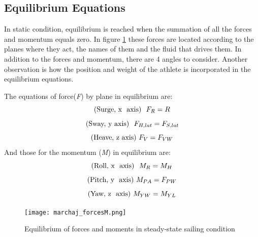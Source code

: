 \subsection {Equilibrium Equations} \label{sec:equil_equat}
In static condition, equilibrium is reached when the summation of all the forces and momentum equals zero. In figure \ref{forces_m} these forces are located according to the planes where they act, the names of them and the fluid that drives them. In addition to the forces and momentum, there are 4 angles to consider. Another observation is how the position and weight of the athlete is incorporated in the equilibrium equations. \par 

The equations of force(\textit{F}) by plane in equilibrium are:
\begin{equation}\label{eq:force_x}
    \text{(Surge, x  \space axis)  \space} F_{R}=R \\
\end{equation}
\begin{equation}\label{eq:force_y}
    \text{(Sway, y\space axis) \space } \space F_{H,lat}=F_{S,lat}\\
\end{equation}
\begin{equation}\label{eq:force_z}
    \text{(Heave, z\space axis)  } \space F_{V}=F_{VW}
\end{equation}
And those for the momentum (\textit{M}) in equilibrium are:
\begin{equation}\label{eq:m_x}
    \text{(Roll, x  \space axis) \space } M_{R}=M_{H} \\
\end{equation}
\begin{equation}\label{eq:m_y}
    \text{(Pitch, y \space axis)  } \space M_{PA}=F_{PW}\\
\end{equation}
\begin{equation}\label{eq:m_z}
    \text{(Yaw, z \space axis)  } \space M_{YW}=M_{YL}
\end{equation}

 \begin{figure}[ht]
\centering
  \texttt{[image: marchaj\_forcesM.png]}
 \caption{Equilibrium of forces and moments in steady-state sailing condition \cite{marchajaereo1979} }
\label{forces_m}
\end{figure}

